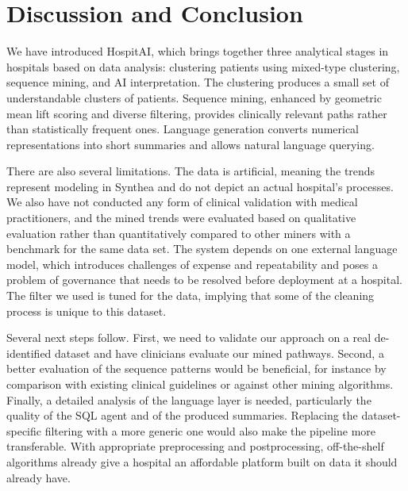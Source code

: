 \section{Discussion and Conclusion}
\label{sec:conclusion}

We have introduced HospitAI, which brings together three analytical stages in hospitals based on data analysis: clustering patients using mixed-type clustering, sequence mining, and AI interpretation. The clustering produces a small set of understandable clusters of patients. Sequence mining, enhanced by geometric mean lift scoring and diverse filtering, provides clinically relevant paths rather than statistically frequent ones. Language generation converts numerical representations into short summaries and allows natural language querying.

There are also several limitations. The data is artificial, meaning the trends represent modeling in Synthea and do not depict an actual hospital's processes. We also have not conducted any form of clinical validation with medical practitioners, and the mined trends were evaluated based on qualitative evaluation rather than quantitatively compared to other miners with a benchmark for the same data set. The system depends on one external language model, which introduces challenges of expense and repeatability and poses a problem of governance that needs to be resolved before deployment at a hospital. The filter we used is tuned for the data, implying that some of the cleaning process is unique to this dataset.

Several next steps follow. First, we need to validate our approach on a real de-identified dataset and have clinicians evaluate our mined pathways. Second, a better evaluation of the sequence patterns would be beneficial, for instance by comparison with existing clinical guidelines or against other mining algorithms. Finally, a detailed analysis of the language layer is needed, particularly the quality of the SQL agent and of the produced summaries. Replacing the dataset-specific filtering with a more generic one would also make the pipeline more transferable. With appropriate preprocessing and postprocessing, off-the-shelf algorithms already give a hospital an affordable platform built on data it should already have.
